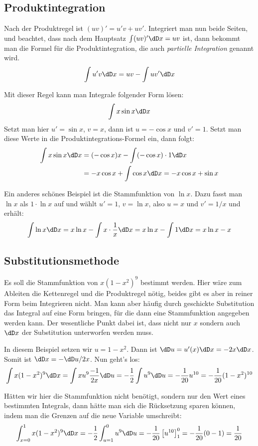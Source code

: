 \subsection{Produktintegration}
Nach der Produktregel ist $(uv)'=u'v+uv'$. Integriert man nun beide Seiten,
und beachtet, dass nach dem Hauptsatz $\int (uv)'\dD x=uv$ ist, dann bekommt
man die Formel für die Produktintegration, die auch \emph{partielle
  Integration} genannt wird.
\begin{equation}
  \label{eq:42}
  \int u'v\dD x= uv - \int uv'\dD x
\end{equation}

Mit dieser Regel kann man \zB Integrale folgender Form lösen:
\[
\int x\sin x\dD x
\]
Setzt man hier $u'=\sin x$, $v=x$, dann ist $u=-\cos x$ und $v'=1$. Setzt man
diese Werte in die Produktintegrations-Formel ein, dann folgt:
\begin{align*}
\int x\sin x\dD x&= (-\cos x)x-\int (-\cos x)\cdot1\dD x\\
&=-x\cos x+\int\cos x\dD x= -x\cos x+\sin x
\end{align*}

Ein anderes schönes Beispiel ist die Stammfunktion von $\ln x$. Dazu fasst man
$\ln x$ als $1\cdot\ln x$ auf und wählt $u'=1$, $v=\ln x$, also $u=x$ und
$v'=1/x$ und erhält:
\[
\int\ln x\dD x=x\ln x-\int x\cdot\frac{1}{x}\dD x=
x\ln x-\int 1\dD x=x\ln x -x
\]

\subsection{Substitutionsmethode}
Es soll die Stammfunktion von $x(1-x^2)^9$ bestimmt werden. Hier wäre zum
Ableiten die Kettenregel und die Produktregel nötig, beides gibt es aber in
reiner Form beim Integrieren nicht. Man kann aber häufig durch geschickte
Substitution das Integral auf eine Form bringen, für die dann eine
Stammfunktion angegeben werden kann. Der wesentliche Punkt dabei ist, dass
nicht nur $x$ sondern auch $\dD x$ der Substitution unterworfen werden muss.

In diesem Beispiel setzen wir $u=1-x^2$. Dann ist $\dD u=u'(x)\dD x=-2x\dD x$.
Somit ist $\dD x=-\dD u/2x$. Nun geht's los:
\[
\int x(1-x^2)^9\dD x=\int x u^9 \frac{-1}{2x}\dD u
=-\frac{1}{2}\int u^9\dD u=-\frac{1}{20}u^{10}=-\frac{1}{20}(1-x^2)^{10}
\]

Hätten wir hier die Stammfunktion nicht benötigt, sondern nur den Wert eines
bestimmten Integrals, dann hätte man sich die Rücksetzung sparen können, indem
man die Grenzen auf die neue Variable umschreibt:
\[
\int_{x=0}^1 x(1-x^2)^9\dD x=-\frac{1}{2}\int_{u=1}^0u^9\dD u
=-\frac{1}{20}\left[u^{10}\right]_1^0=-\frac{1}{20}(0-1)=\frac{1}{20}
\]

